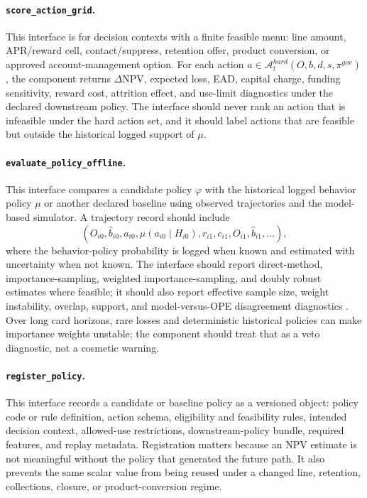 \documentclass[11pt]{article}
\newcommand{\NPV}{\mathrm{NPV}}
\newcommand{\1}{\mathbf{1}}
\newcommand{\code}[1]{\nolinkurl{#1}}
\begin{document}
\paragraph{\code{score_action_grid}.}
This interface is for decision contexts with a finite feasible menu: line amount,
APR/reward cell, contact/suppress, retention offer, product conversion, or
approved account-management option. For each action
$a\in\mathcal{A}^{hard}_{t}(O,b,d,s,\pi^{gov})$, the component returns
$\Delta \NPV$, expected loss, EAD, capital charge, funding sensitivity, reward
cost, attrition effect, and use-limit diagnostics under the declared downstream
policy. The interface should never rank an action that is infeasible under the
hard action set, and it should label actions that are feasible but outside the
historical logged support of $\mu$.

\paragraph{\code{evaluate_policy_offline}.}
This interface compares a candidate policy $\varphi$ with the historical logged
behavior policy $\mu$ or another declared baseline using observed trajectories
and the model-based simulator. A trajectory record should include
\[
  (O_{i0},\widehat b_{i0},a_{i0},\mu(a_{i0}\mid H_{i0}),
    r_{i1},c_{i1},O_{i1},\widehat b_{i1},\ldots),
\]
where the behavior-policy probability is logged when known and estimated with
uncertainty when not known. The interface should report direct-method,
importance-sampling, weighted importance-sampling, and doubly robust estimates
where feasible; it should also report effective sample size, weight instability,
overlap, support, and model-versus-OPE disagreement diagnostics
\citep{dudik2011dr,jiangli2016dr,thomasbrunskill2016ope,huwager2021pomdpope}.
Over long card horizons, rare losses and deterministic historical policies can
make importance weights unstable; the component should treat that as a veto
diagnostic, not a cosmetic warning.

\paragraph{\code{register_policy}.}
This interface records a candidate or baseline policy as a versioned object:
policy code or rule definition, action schema, eligibility and feasibility
rules, intended decision context, allowed-use restrictions, downstream-policy
bundle, required features, and replay metadata. Registration matters because an
NPV estimate is not meaningful without the policy that generated the future path.
It also prevents the same scalar value from being reused under a changed line,
retention, collections, closure, or product-conversion regime.
\end{document}
